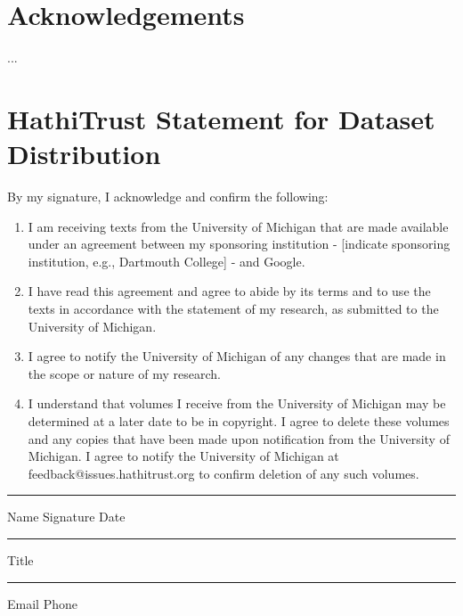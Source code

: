 \documentclass{anthology-ch}         %
\begin{document}
\section*{Acknowledgements}

...

\printbibliography

\appendix

\section{HathiTrust Statement for Dataset Distribution} \label{appdx:first}

By my signature, I acknowledge and confirm the following:

\begin{enumerate}
    \item  I am receiving texts from the University of Michigan that are made available under an agreement between my sponsoring institution - [indicate sponsoring institution, e.g., Dartmouth College] - and Google.
    \item  I have read this agreement and agree to abide by its terms and to use the texts in accordance with the statement of my research, as submitted to the University of Michigan.
    \item  I agree to notify the University of Michigan of any changes that are made in the scope or nature of my research.
    \item  I understand that volumes I receive from the University of Michigan may be determined at a later date to be in copyright. I agree to delete these volumes and any copies that have been made upon notification from the University of Michigan. I agree to notify the University of Michigan at feedback@issues.hathitrust.org to confirm deletion of any such volumes.
\end{enumerate}

\rule{\textwidth}{0.5pt}

Name \hspace{0.3\textwidth} Signature \hspace{0.3\textwidth} Date

\rule{\textwidth}{0.5pt}

Title

\rule{\textwidth}{0.5pt}

Email \hspace{0.3\textwidth}  Phone
\end{document}

